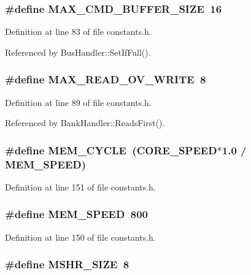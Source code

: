 \subsubsection[{MAX\_\-CMD\_\-BUFFER\_\-SIZE}]{\setlength{\rightskip}{0pt plus 5cm}\#define MAX\_\-CMD\_\-BUFFER\_\-SIZE~16}\label{constants_8h_c68da12756b7440a3b472ec3cf7b9e20}




Definition at line 83 of file constants.h.

Referenced by BusHandler::SetIfFull().
\subsubsection[{MAX\_\-READ\_\-OV\_\-WRITE}]{\setlength{\rightskip}{0pt plus 5cm}\#define MAX\_\-READ\_\-OV\_\-WRITE~8}\label{constants_8h_807dcc509b3155f4be5d3979e3d910dd}




Definition at line 89 of file constants.h.

Referenced by BankHandler::ReadsFirst().
\subsubsection[{MEM\_\-CYCLE}]{\setlength{\rightskip}{0pt plus 5cm}\#define MEM\_\-CYCLE~(CORE\_\-SPEED$\ast$1.0 / MEM\_\-SPEED)}\label{constants_8h_f3ca76157ad0063166fc1d77e0f04b02}




Definition at line 151 of file constants.h.
\subsubsection[{MEM\_\-SPEED}]{\setlength{\rightskip}{0pt plus 5cm}\#define MEM\_\-SPEED~800}\label{constants_8h_e6133cbb505a6b58822bd8dfbbca32ae}




Definition at line 150 of file constants.h.
\subsubsection[{MSHR\_\-SIZE}]{\setlength{\rightskip}{0pt plus 5cm}\#define MSHR\_\-SIZE~8}\label{constants_8h_f08f9394c5d87e5677f5e8b36343b36b}




